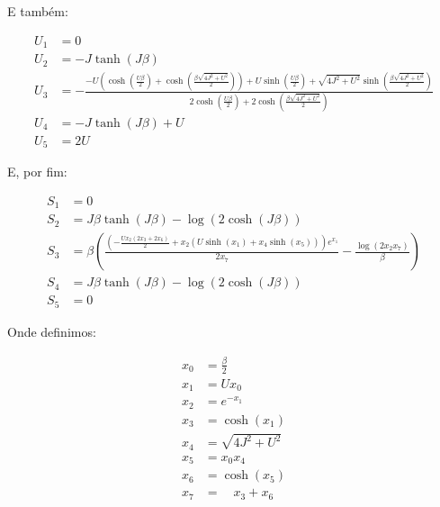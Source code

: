E também:

\begin{subequations}
\begin{align}
U_1 &= 0 \\
U_2 &= - J \tanh{\left (J \beta \right )} \\
U_3 &= - \frac{- U \left(\cosh{\left (\frac{U \beta}{2} \right )} + \cosh{\left (\frac{\beta \sqrt{4 J^{2} + U^{2}}}{2} \right )}\right) + U \sinh{\left (\frac{U \beta}{2} \right )} + \sqrt{4 J^{2} + U^{2}} \sinh{\left (\frac{\beta \sqrt{4 J^{2} + U^{2}}}{2} \right )}}{2 \cosh{\left (\frac{U \beta}{2} \right )} + 2 \cosh{\left (\frac{\beta \sqrt{4 J^{2} + U^{2}}}{2} \right )}} \\
U_4 &= - J \tanh{\left (J \beta \right )} + U \\
U_5 &= 2U
\end{align}
\end{subequations}

E, por fim:

\begin{subequations}
\begin{align}
S_1 &= 0 \\
S_2 &= J \beta \tanh{\left (J \beta \right )} - \log{\left (2 \cosh{\left (J \beta \right )} \right )} \\
S_3 &= \beta \left(\frac{\left(- \frac{U x_{2} \left(2 x_{3} + 2 x_{6}\right)}{2} + x_{2} \left(U \sinh{\left (x_{1} \right )} + x_{4} \sinh{\left (x_{5} \right )}\right)\right) e^{x_{1}}}{2 x_{7}} - \frac{\log{\left (2 x_{2} x_{7} \right )}}{\beta}\right) \\
S_4 &= J \beta \tanh{\left (J \beta \right )} - \log{\left (2 \cosh{\left (J \beta \right )} \right )} \\
S_5 &= 0
\end{align}
\end{subequations}

Onde definimos:

\begin{subequations}
\begin{align}
x_{0} &= \frac{\beta}{2} \\
x_{1} &= U x_{0} \\
x_{2} &= e^{- x_{1}} \\
x_{3} &= \cosh{\left (x_{1} \right )} \\
x_{4} &= \sqrt{4 J^{2} + U^{2}} \\
x_{5} &= x_{0} x_{4} \\
x_{6} &= \cosh{\left (x_{5} \right )} \\
x_{7} &= \quad x_{3} + x_{6}
\end{align}
\end{subequations}

